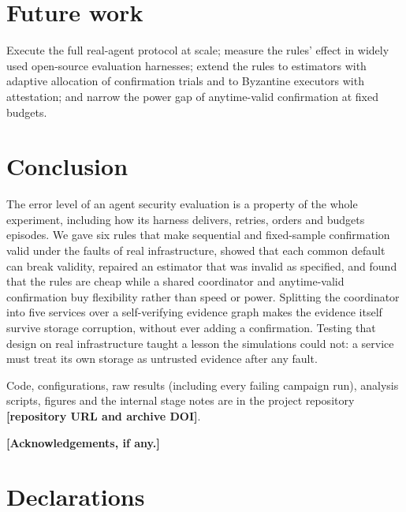 \documentclass[pdflatex,sn-mathphys-num]{sn-jnl}
\theoremstyle{thmstyleone}
\theoremstyle{thmstyletwo}
\theoremstyle{thmstylethree}
\newcommand{\placeholder}[1]{\textbf{[#1]}}
\begin{document}
\section{Future work}\label{sec:future}
Execute the full real-agent protocol at scale; measure the rules' effect in widely used open-source evaluation harnesses; extend the rules to estimators with adaptive allocation of confirmation trials and to Byzantine executors with attestation; and narrow the power gap of anytime-valid confirmation at fixed budgets.

\section{Conclusion}\label{sec:conclusion}
The error level of an agent security evaluation is a property of the whole experiment, including how its harness delivers, retries, orders and budgets episodes. We gave six rules that make sequential and fixed-sample confirmation valid under the faults of real infrastructure, showed that each common default can break validity, repaired an estimator that was invalid as specified, and found that the rules are cheap while a shared coordinator and anytime-valid confirmation buy flexibility rather than speed or power. Splitting the coordinator into five services over a self-verifying evidence graph makes the evidence itself survive storage corruption, without ever adding a confirmation. Testing that design on real infrastructure taught a lesson the simulations could not: a service must treat its own storage as untrusted evidence after any fault.


\backmatter

 Code, configurations, raw results (including every failing campaign run), analysis scripts, figures and the internal stage notes are in the project repository \placeholder{repository URL and archive DOI}.

 \placeholder{Acknowledgements, if any.}

\section*{Declarations}
\end{document}
